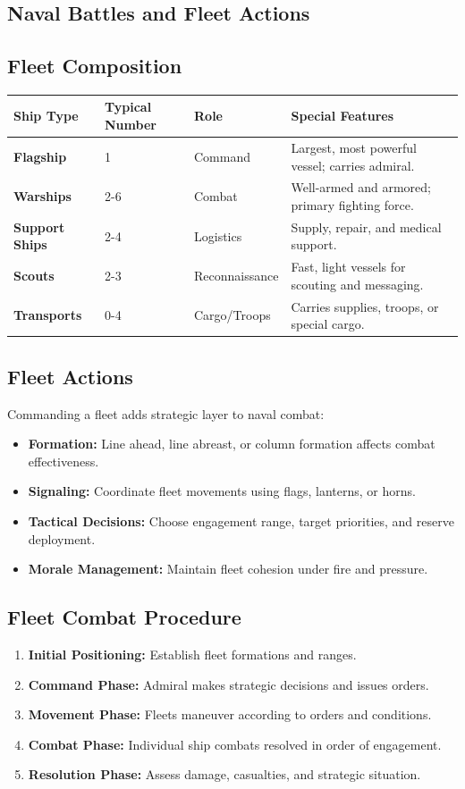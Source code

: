 \documentclass[11pt,oneside]{book}
\begin{document}
\begin{itemize}
\section{Naval Battles and Fleet Actions}

\subsection*{Fleet Composition}
\begin{tabularx}{\linewidth}{@{}l l l X@{}}
\toprule
\textbf{Ship Type} & \textbf{Typical Number} & \textbf{Role} & \textbf{Special Features}\\
\midrule
\textbf{Flagship} & 1 & Command & Largest, most powerful vessel; carries admiral.\\
\textbf{Warships} & 2-6 & Combat & Well-armed and armored; primary fighting force.\\
\textbf{Support Ships} & 2-4 & Logistics & Supply, repair, and medical support.\\
\textbf{Scouts} & 2-3 & Reconnaissance & Fast, light vessels for scouting and messaging.\\
\textbf{Transports} & 0-4 & Cargo/Troops & Carries supplies, troops, or special cargo.\\
\bottomrule
\end{tabularx}

\subsection*{Fleet Actions}
Commanding a fleet adds strategic layer to naval combat:

\begin{itemize}
  \item \textbf{Formation:} Line ahead, line abreast, or column formation affects combat effectiveness.
  \item \textbf{Signaling:} Coordinate fleet movements using flags, lanterns, or horns.
  \item \textbf{Tactical Decisions:} Choose engagement range, target priorities, and reserve deployment.
  \item \textbf{Morale Management:} Maintain fleet cohesion under fire and pressure.
\end{itemize}

\subsection*{Fleet Combat Procedure}
\begin{enumerate}
  \item \textbf{Initial Positioning:} Establish fleet formations and ranges.
  \item \textbf{Command Phase:} Admiral makes strategic decisions and issues orders.
  \item \textbf{Movement Phase:} Fleets maneuver according to orders and conditions.
  \item \textbf{Combat Phase:} Individual ship combats resolved in order of engagement.
  \item \textbf{Resolution Phase:} Assess damage, casualties, and strategic situation.
\end{enumerate}


\end{itemize}
\end{document}
